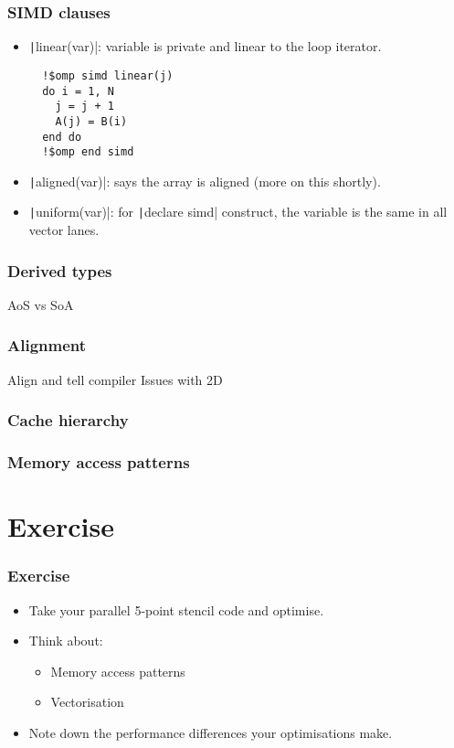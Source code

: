\documentclass{beamer}
\begin{document}
\begin{frame}[fragile]
\frametitle{SIMD clauses}
\begin{itemize}
  \item \texttt|linear(var)|: variable is private and linear to the loop iterator.
  \begin{verbatim}
  !$omp simd linear(j)
  do i = 1, N
    j = j + 1
    A(j) = B(i)
  end do
  !$omp end simd
  \end{verbatim}
  \item \texttt|aligned(var)|: says the array is aligned (more on this shortly).
  \item \texttt|uniform(var)|: for \texttt|declare simd| construct, the variable is the same in all vector lanes.
\end{itemize}
\end{frame}

\begin{frame}
\frametitle{Derived types}
AoS vs SoA
\end{frame}

\begin{frame}
\frametitle{Alignment}
Align and tell compiler
Issues with 2D
\end{frame}

\begin{frame}
\frametitle{Cache hierarchy}
\end{frame}

\begin{frame}
\frametitle{Memory access patterns}
\end{frame}

\section{Exercise}
\begin{frame}
\frametitle{Exercise}
\begin{itemize}
  \item Take your parallel 5-point stencil code and optimise.
  \item Think about:
    \begin{itemize}
      \item Memory access patterns
      \item Vectorisation
    \end{itemize}
  \item Note down the performance differences your optimisations make.
\end{itemize}
\end{frame}

\end{document}
